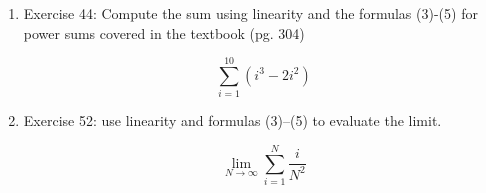 \documentclass[11pt]{article}
\begin{document}
\begin{enumerate}
\item 
Exercise 44: Compute the sum using linearity and the formulas (3)-(5) for power sums covered in the textbook (pg. 304)

\[
    \sum_{i=1}^{10} (i^3 - 2i^2)
\]

\item
Exercise 52: use linearity and formulas (3)–(5) to evaluate the limit.

\[
    \lim_{N\to\infty} \sum_{i=1}^N \frac{i}{N^2}
\]




\end{enumerate}
%

%
\end{document}
